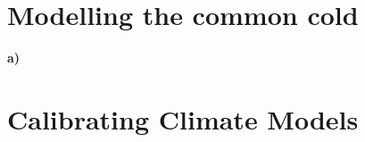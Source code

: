 \documentclass[11pt, a4paper, english]{NTNUoving}
\begin{document}
\section*{Modelling the common cold}
\textbf{a)}



\section*{Calibrating Climate Models}
\end{document}
